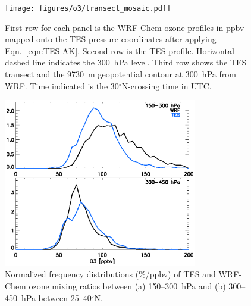 \begin{figure}
 \texttt{[image: figures/o3/transect\_mosaic.pdf]}
 \caption{First row for each panel is the WRF-Chem ozone profiles in ppbv mapped onto the TES
pressure coordinates after applying Eqn.~\ref{eqn:TES-AK}. Second row is the TES profile. Horizontal
dashed line indicates the 300~hPa level. Third row shows the TES transect and the 9730~m
geopotential contour at 300~hPa from WRF. Time indicated is the 30$^\circ$N-crossing time in UTC.}
 \label{fig:o3_transect}
 \end{figure}

 \begin{figure}
 \noindent\includegraphics[width=20pc]{figures/o3/o3_teswrfhist.eps} %
 \caption{Normalized frequency distributions (\%/ppbv) of TES and WRF-Chem ozone mixing ratios
between (a) 150--300~hPa and (b) 300--450~hPa between 25--40$^\circ$N.}
 \label{fig:o3_distr}
 \end{figure}

